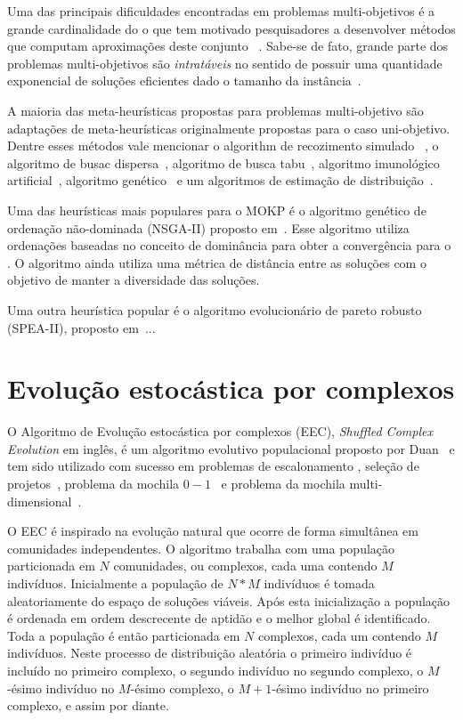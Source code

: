 Uma das principais dificuldades encontradas em problemas multi-objetivos
é a grande cardinalidade do \paretoset o que tem motivado pesquisadores
a desenvolver métodos que computam aproximações deste conjunto
~\cite{bazgan2015approximate, vanderpooten2017covers}.
Sabe-se de fato, grande parte dos problemas multi-objetivos são \emph{intratáveis}
no sentido de possuir uma quantidade exponencial de soluções eficientes
dado o tamanho da instância~\cite{ehrgott2013multicriteria}.

A maioria das meta-heurísticas propostas para problemas multi-objetivo
são adaptações de meta-heurísticas originalmente propostas para
o caso uni-objetivo.
Dentre esses métodos vale mencionar o algorithm de recozimento simulado
~\cite{czyzzak1998pareto},
o algoritmo de busac dispersa~\cite{da2006scatter,da2007integrating},
algoritmo de busca tabu~\cite{gandibleux2000tabu},
algoritmo imunológico artificial~\cite{gao2014quantum},
algoritmo genético~\cite{abdelaziz1999hybrid}
e um algoritmos de estimação de distribuição~\cite{martins2017hybrid}.

Uma das heurísticas mais populares para o MOKP é o algoritmo genético
de ordenação não-dominada (NSGA-II) proposto em~\cite{deb2002fast}.
Esse algoritmo utiliza ordenações baseadas no conceito de dominância
para obter a convergência para o \paretoset.
O algoritmo ainda utiliza uma métrica de distância entre as soluções
com o objetivo de manter a diversidade das soluções.

Uma outra heurística popular é o algoritmo evolucionário de pareto robusto
(SPEA-II), proposto em~\cite{zitzler1998multiobjective}...

\section{Evolução estocástica por complexos}


O Algoritmo de Evolução estocástica por complexos (EEC),
\emph{Shuffled Complex Evolution} em inglês,
é um algoritmo evolutivo populacional proposto por Duan~\cite{duan1992effective}
e tem sido utilizado com sucesso em problemas de escalonamento
\cite{zhao2015shuffled}, seleção de projetos~\cite{elbeltagi2007modified},
problema da mochila $0-1$~\cite{bhattacharjee2014shuffled} e
problema da mochila multi-dimensional~\cite{baroni2015shuffled,baroni2016shuffled}.

O EEC é inspirado na evolução natural que ocorre de forma simultânea em
comunidades independentes.
O algoritmo trabalha com uma população particionada em $N$ comunidades,
ou complexos, cada uma contendo $M$ indivíduos.
Inicialmente a população de $N*M$ indivíduos é tomada aleatoriamente do espaço
de soluções viáveis.
Após esta inicialização a população é ordenada em ordem descrecente de aptidão
e o melhor global é identificado.
Toda a população é então particionada em $N$ complexos, cada um contendo $M$ indivíduos.
Neste processo de distribuição aleatória o primeiro indivíduo é incluído
no primeiro complexo, o segundo indivíduo no segundo complexo, o $M$-ésimo
indivíduo no $M$-ésimo complexo, o $M+1$-ésimo indivíduo no primeiro complexo,
e assim por diante.

